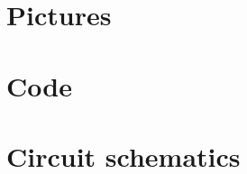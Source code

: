 \documentclass[conference]{IEEEtran}
\begin{document}
\begin{appendices}

\section{Pictures}

\section{Code}













\section{Circuit schematics}

\end{appendices}
\end{document}
